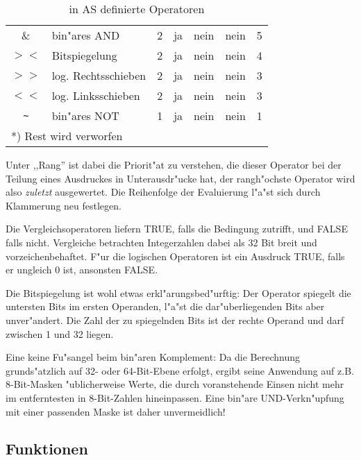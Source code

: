 \documentclass[12pt,a4paper,twoside]{report}
\newcommand{\ii}[1]{{\it #1}}
\begin{document}
\begin{table*}[htbp]
\begin{center}
\begin{tabular}{|c|l|c|c|c|c|c|}
\&          & bin"ares AND         & 2 & ja   & nein & nein & 5 \\
$><$        & Bitspiegelung        & 2 & ja   & nein & nein & 4 \\
$>>$        & log. Rechtsschieben  & 2 & ja   & nein & nein & 3 \\
$<<$        & log. Linksschieben   & 2 & ja   & nein & nein & 3 \\
\verb! ~ !  & bin"ares NOT         & 1 & ja   & nein & nein & 1 \\
\hline
\multicolumn{7}{|l|}{*) Rest wird verworfen} \\
\hline
\end{tabular}\end{center}
\caption{in AS definierte Operatoren\label{TabOps}}
\end{table*}
Unter ,,Rang'' ist dabei die Priorit"at zu verstehen, die dieser Operator bei
der Teilung eines Ausdruckes in Unterausdr"ucke hat, der rangh"ochste
Operator wird also \ii{zuletzt} ausgewertet.  Die Reihenfolge der
Evaluierung l"a"st sich durch Klammerung neu festlegen.
\par
Die Vergleichsoperatoren liefern TRUE, falls die Bedingung zutrifft,
und FALSE falls nicht.  Vergleiche betrachten Integerzahlen dabei als
32 Bit breit und vorzeichenbehaftet. F"ur die logischen Operatoren
ist ein Ausdruck TRUE, falls er ungleich 0 ist, ansonsten FALSE.
\par
Die Bitspiegelung ist wohl etwas erkl"arungsbed"urftig: Der Operator
spiegelt die untersten Bits im ersten Operanden, l"a"st die
dar"uberliegenden Bits aber unver"andert.  Die Zahl der zu spiegelnden
Bits ist der rechte Operand und darf zwischen 1 und 32 liegen.
\par
Eine keine Fu"sangel beim bin"aren Komplement: Da die Berechnung
grunds"atzlich auf 32- oder 64-Bit-Ebene erfolgt, ergibt seine Anwendung
auf z.B. 8-Bit-Masken "ublicherweise Werte, die durch voranstehende
Einsen nicht mehr im entferntesten in 8-Bit-Zahlen hineinpassen.  Eine
bin"are UND-Verkn"upfung mit einer passenden Maske ist daher unvermeidlich!

\subsection{Funktionen}
\end{document}

